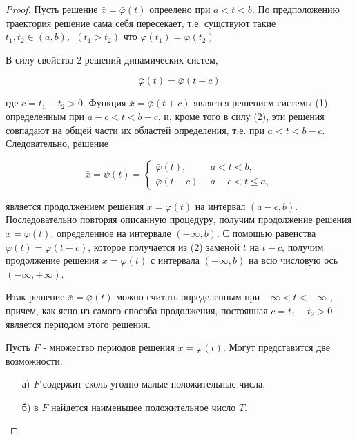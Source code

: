 \documentclass{article}
\theoremstyle{definition} \newtheorem*{theorem*}{Теорема}
\theoremstyle{plain} \newtheorem{theorem}{Теорема}[section]
\theoremstyle{definition} \newtheorem*{corollary*}{Следствие}
\theoremstyle{definition} \newtheorem{corollary}{Следствие}[section]
\begin{document}
\begin{proof}
    Пусть решение $\bar{x} = \bar{\varphi}(t)$ опреелено при $a < t < b$.
    По предположению траектория решение сама себя пересекает,
    т.е. сущствуют такие
    $t_1,t_2 \in (a,b) ,\ \ (t_1 > t_2)$ что
    $\bar{\varphi}(t_1) = \bar{\varphi}(t_2)$

    В силу свойства 2 решений динамических систем,

    \begin{equation}
        \bar{\varphi}(t) = \bar{\varphi}(t + c)
    \end{equation}

    где $c = t_1 - t_2 > 0$.
    Функция $\bar{x} = \bar{\varphi}(t+c)$ является решением системы (1),
    определенным при $a-c < t < b-c$, и, кроме того в силу (2),
    эти решения совпадают на общей части их областей определения,
    т.е. при $a < t < b-c$. Следовательно, решение

    \begin{equation}
        \bar{x} = \bar{\psi}(t) =
        \begin{cases}
            \bar{\varphi}(t), &a < t < b,\\
            \bar{\varphi}(t + c), & a-c < t \le a,
        \end{cases}
    \end{equation}

    является продолжением решения $\bar{x} = \bar{\varphi}(t)$
    на интервал $(a-c, b)$.
    Последовательно повторяя описанную процедуру,
    получим продолжение
    решения $\bar{x} = \bar{\varphi}(t)$, определенное
    на интервале $(- \infty, b)$.
\newline
    С помощью равенства $\bar{\varphi}(t)
    = \bar{\varphi}(t - c)$, которое
    получается из (2) заменой $t$ на $t - c$, получим продолжение
    решения $\bar{x} = \bar{\varphi}(t)$ с интервала
    $(- \infty, b)$ на всю числовую ось $(-\infty, +\infty)$.

    Итак решение $\bar{x} = \bar{\varphi}(t)$  можно считать
    определенным при $- \infty < t < + \infty$ , причем,
    как ясно из самого способа продолжения, постоянная
    $c = t_1 - t_2 > 0$ является периодом этого решения.

    Пусть $F$ - множество периодов решения
    $\bar{x} = \bar{\varphi}(t)$.
    Могут представится две возможности:

    \begin{itemize}
        \item[а)] $F$ содержит сколь угодно малые
            положительные числа,
        \item[б)] в $F$ найдется наименьшее положительное
            число $T$.
    \end{itemize}


\end{proof}
\end{document}

